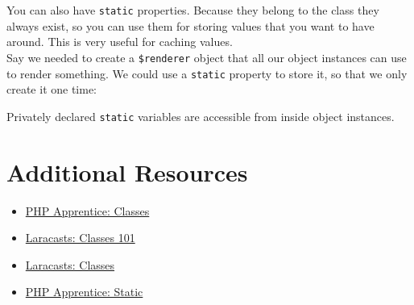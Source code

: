 You can also have \texttt{static} properties. Because they belong to the class they always exist, so you can use them for storing values that you want to have around. This is very useful for caching values.
\\

Say we needed to create a \texttt{\$renderer} object that all our object instances can use to render\textellipsis{} something. We could use a \texttt{static} property to store it, so that we only create it one time:


Privately declared \texttt{static} variables are accessible from inside object instances.


\section{Additional Resources}

\begin{itemize}[leftmargin=*]
    \item \href{https://phpapprentice.com/classes.html}{PHP Apprentice: Classes}
    \item \href{https://laracasts.com/series/php-for-beginners/episodes/12}{Laracasts: Classes 101}
    \item \href{https://laracasts.com/series/object-oriented-bootcamp-in-php/episodes/1}{Laracasts: Classes}
    \item \href{https://phpapprentice.com/static.html}{PHP Apprentice: Static}
\end{itemize}
